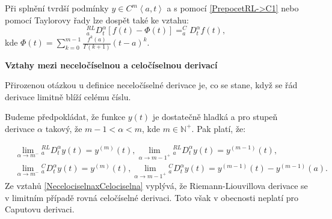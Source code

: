 \documentclass[a4paper,12pt,twoside]{article}
\theoremstyle{definition}
\theoremstyle{remark}
\numberwithin{equation}{section}
\numberwithin{table}{section}
\numberwithin{figure}{section}
\newcommand{\N}{\mathbb{N}}
\begin{document}
Při splnění tvrdší podmínky $y \in C^{m} \left\langle a, t\right\rangle $ a s pomocí \eqref{PrepocetRL->C1} nebo pomocí Taylorovy řady lze dospět také ke vztahu:
\begin{equation}
	_{a}^{RL}D^{\alpha}_{t} \left[f\left(t\right) - \Phi \left(t\right) \right] = _{a}^{C}D^{\alpha}_{t} f\left(t\right),
\end{equation} 
kde $\Phi \left(t\right) = \sum_{k=0}^{m-1} \frac{f^{k}\left(a\right)}{\Gamma \left(k+1\right)} \left(t-a\right)^{k}$.

\medskip
\noindent \textbf{Vztahy mezi neceločíselnou a celočíselnou derivací}

\medskip
\noindent Přirozenou otázkou u definice neceločíselné derivace je, co se stane, když se řád derivace limitně blíží celému číslu.

Budeme předpokládat, že funkce $y\left(t\right)$ je dostatečně hladká a pro stupeň derivace $\alpha$ takový, že $m-1<\alpha<m$, kde $m \in \N^{+}$. Pak platí, že:

\begin{equation} \label{NecelociselnaxCelociselna}
	\begin{aligned}
		&\lim\limits_{\alpha \to m^{-}} {_{a}^{RL}D^{\alpha}_{t}} y\left(t\right) = y^{\left(m\right)} \left(t\right),
		\lim\limits_{\alpha \to {m-1}^{+}} {_{a}^{RL}D^{\alpha}_{t}} y\left(t\right) = y^{\left(m-1\right)} \left(t\right), \\
		&\lim\limits_{\alpha \to m^{-}} {_{a}^{C}D^{\alpha}_{t}} y\left(t\right) = y^{\left(m\right)} \left(t\right),
		\lim\limits_{\alpha \to {m-1}^{+}} {_{a}^{C}D^{\alpha}_{t}} y\left(t\right) = y^{\left(m-1\right)} \left(t\right)- y^{\left(m-1\right)} \left(a\right).
	\end{aligned}
\end{equation} 
\cite{Cangpin}
Ze vztahů \ref{NecelociselnaxCelociselna} vyplývá, že Riemann-Liouvillova derivace se v limitním případě rovná celočíselné derivaci. Toto však v obecnosti neplatí pro Caputovu derivaci.
\end{document}

